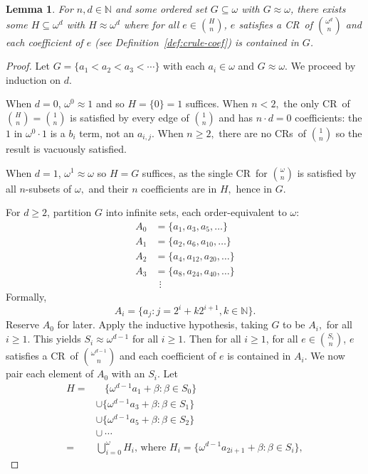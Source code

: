 \documentclass[10pt,a4paper]{article}
\newcommand{\om}{\omega}
\newcommand{\oequiv}{\approx}
\newcommand{\N}{\mathbb{N}}
\newcommand{\crulenospace}{CR}
\newcommand{\crule}{\crulenospace~}
\newcommand{\crules}{\crulenospace s~}
\newcommand{\numpoints}{n}
\newcommand{\inumpoints}{i}
\newcommand{\commonconst}{a}
\newcommand{\Commonconst}{A}
\theoremstyle{plain}
\newtheorem{lemma}[theorem]{Lemma}
\theoremstyle{definition}
\begin{document}
\begin{lemma}
\label{le:bend-nats}
For $\numpoints, d \in \N$ and some ordered set
$G \subseteq \om$ with $G \oequiv \om$, there exists some $H \subseteq \om^d$ with $H \oequiv \om^d$ where for all $e \in \binom{H}{\numpoints}$, $e$ satisfies a \crule of $\binom{\om^d}{\numpoints}$ and each coefficient of $e$ (see Definition~\ref{def:crule-coef}) is contained in $G$.
\end{lemma}
\begin{proof}
Let $G = \{
\commonconst_1 < \commonconst_2 < \commonconst_3 < \cdots\}$ with each
$\commonconst_{\inumpoints} \in \om$ and $G \oequiv \om$. We proceed by induction on $d$.

When $d=0$, $\om^0 \oequiv 1$ and so $H = \{0\} = 1$ suffices. When $n < 2,$
the only \crule of $\binom{H}{n} = \binom{1}{n}$ is satisfied by every edge
of $\binom{1}{n}$ and has $n \cdot d = 0$ coefficients:
the $1$ in $\om^0 \cdot 1$ is a $b_i$
term, not an $a_{i,j}.$
When $n\geq 2,$ there are no \crules of $\binom{1}{n}$ so the result
is vacuously satisfied.

When $d=1$, $\om^1 \oequiv \om$ so $H=G$ suffices, as the single \crule for $\binom{\om}{n}$
is satisfied by all $n$-subsets of $\om,$ and their $n$ coefficients are in $H,$ hence in $G.$

For $d \geq 2$, partition $G %
$ into infinite sets, each order-equivalent to $\om$: \begin{align*}
A_0 & = \{\commonconst_1,\commonconst_3,\commonconst_5,\ldots\}\\
A_1 & = \{\commonconst_2,\commonconst_6,\commonconst_{10},\ldots\}\\
A_2 & = \{\commonconst_4,\commonconst_{12},\commonconst_{20},\ldots\}\\
A_3 & = \{\commonconst_8,\commonconst_{24},\commonconst_{40},\ldots\}\\
& ~~\vdots
\end{align*}
Formally, $$
\Commonconst_i = \{\commonconst_j \colon j = 2^i + k2^{i+1}, k \in \N \}.
$$
Reserve $\Commonconst_0$ for later. Apply the inductive hypothesis, taking $G$ to be $\Commonconst_i,$ for all $i \geq 1$. This yields $S_i \oequiv \om^{d-1}$ for all $i \geq 1$. Then for all $i \geq 1$, for all $e \in \binom{S_i}{\numpoints}$, $e$ satisfies a \crule of $\binom{\om^{d-1}}{\numpoints}$ and each coefficient of $e$ is contained in $\Commonconst_i$. We now pair each element of $\Commonconst_0$ with an $S_i.$ Let \begin{align*}
H = & ~~~~\!\{\om^{d-1}\commonconst_{1} + \beta : \beta \in S_0\} \\
 & \cup \{\om^{d-1}\commonconst_{3} + \beta : \beta \in S_1\} \\
 & \cup \{\om^{d-1}\commonconst_{5} + \beta : \beta \in S_2 \}\\
& \cup ~\cdots\\
= & \bigcup_{i = 0}^\omega H_i\text{, where } H_i=
\{\om^{d-1}\commonconst_{2i+1} + \beta : \beta \in S_i\},
\end{align*}


\end{proof}
\end{document}
